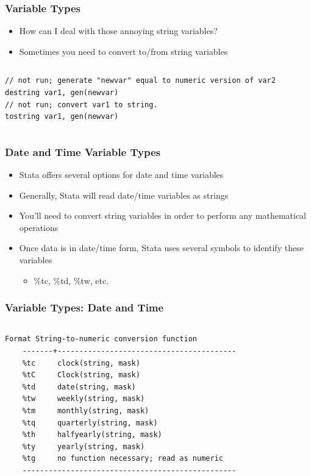 \documentclass[table]{beamer}
\begin{document}
\begin{frame}[fragile]
\frametitle{Variable Types}
\label{sec-5-3}

\begin{itemize}
\item How can I deal with those annoying string
  variables?
\item Sometimes you need to convert to/from string variables
\end{itemize}
\vspace{-.5em} \begin{columns}  \begin{block}{}

\begin{verbatim}
// not run; generate "newvar" equal to numeric version of var2
destring var1, gen(newvar)
// not run; convert var1 to string.
tostring var1, gen(newvar)
\end{verbatim}
\end{block} \end{columns}
\end{frame}
\begin{frame}
\frametitle{Date and Time Variable Types}
\label{sec-5-4}

\begin{itemize}
\item Stata offers several options for date and time
  variables
\item Generally, Stata will read date/time variables as
  strings
\item You'll need to convert string variables in order to
  perform any mathematical operations
\item Once data is in date/time form, Stata uses
  several symbols to identify these variables
\begin{itemize}
\item \%tc, \%td, \%tw, etc.
\end{itemize}
\end{itemize}
\end{frame}
\begin{frame}[fragile]
\frametitle{Variable Types: Date and Time}
\label{sec-5-5}



\vspace{-.5em}
 \begin{columns}
 \begin{block}{}
 \begin{verbatim}
Format String-to-numeric conversion function
    -------+-----------------------------------------
    %tc     clock(string, mask)
    %tC     Clock(string, mask)
    %td     date(string, mask)
    %tw     weekly(string, mask)
    %tm     monthly(string, mask)
    %tq     quarterly(string, mask)
    %th     halfyearly(string, mask)
    %ty     yearly(string, mask)
    %tg     no function necessary; read as numeric
    -------------------------------------------------
\end{verbatim}
 \end{block}
 \end{columns}
 \vspace{.25em}
 
\end{frame}
\end{document}
